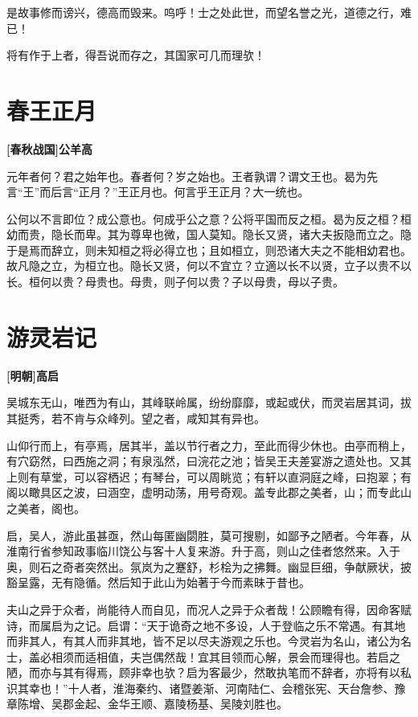 \documentclass[UTF8,titlepage,oneside]{ctexbook}
\begin{document}
是故事修而谤兴，德高而毁来。呜呼！士之处此世，而望名誉之光，道德之行，难已！

将有作于上者，得吾说而存之，其国家可几而理欤！


\chapter*{春王正月}
\begin{center}
	\textbf{[春秋战国]公羊高}
\end{center}

元年者何？君之始年也。春者何？岁之始也。王者孰谓？谓文王也。曷为先言“王”而后言“正月？”王正月也。何言乎王正月？大一统也。

公何以不言即位？成公意也。何成乎公之意？公将平国而反之桓。曷为反之桓？桓幼而贵，隐长而卑。其为尊卑也微，国人莫知。隐长又贤，诸大夫扳隐而立之。隐于是焉而辞立，则未知桓之将必得立也；且如桓立，则恐诸大夫之不能相幼君也。故凡隐之立，为桓立也。隐长又贤，何以不宜立？立適以长不以贤，立子以贵不以长。桓何以贵？母贵也。母贵，则子何以贵？子以母贵，母以子贵。


\chapter*{游灵岩记}
\begin{center}
	\textbf{[明朝]高启}
\end{center}


吴城东无山，唯西为有山，其峰联岭属，纷纷靡靡，或起或伏，而灵岩居其词，拔其挺秀，若不肯与众峰列。望之者，咸知其有异也。


山仰行而上，有亭焉，居其半，盖以节行者之力，至此而得少休也。由亭而稍上，有穴窈然，曰西施之洞；有泉泓然，曰浣花之池；皆吴王夫差宴游之遗处也。又其上则有草堂，可以容栖迟；有琴台，可以周眺览；有轩以直洞庭之峰，曰抱翠；有阁以瞰具区之波，曰涵空，虚明动荡，用号奇观。盖专此郡之美者，山；而专此山之美者，阁也。


启，吴人，游此虽甚亟，然山每匿幽閟胜，莫可搜剔，如鄙予之陋者。今年春，从淮南行省参知政事临川饶公与客十人复来游。升于高，则山之佳者悠然来。入于奥，则石之奇者突然出。氛岚为之蹇舒，杉桧为之拂舞。幽显巨细，争献厥状，披豁呈露，无有隐循。然后知于此山为始著于今而素昧于昔也。


夫山之异于众者，尚能待人而自见，而况人之异于众者哉！公顾瞻有得，因命客赋诗，而属启为之记。启谓：“天于诡奇之地不多设，人于登临之乐不常遇。有其地而非其人，有其人而非其地，皆不足以尽夫游观之乐也。今灵岩为名山，诸公为名士，盖必相须而适相值，夫岂偶然哉！宜其目领而心解，景会而理得也。若启之陋，而亦与其有得焉，顾非幸也欤？启为客最少，然敢执笔而不辞者，亦将有以私识其幸也！”十人者，淮海秦约、诸暨姜渐、河南陆仁、会稽张宪、天台詹参、豫章陈增、吴郡金起、金华王顺、嘉陵杨基、吴陵刘胜也。 
\end{document}
